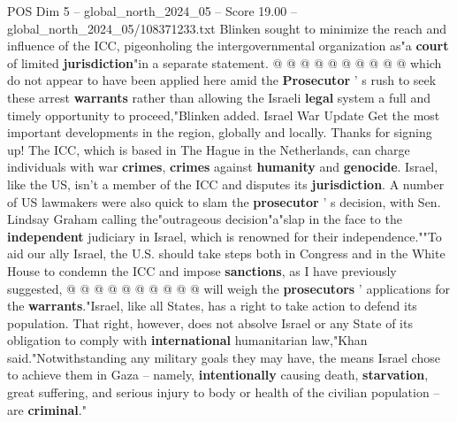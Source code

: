 \begin{textsample}{POS Dim 5 – global\_north\_2024\_05 – Score 19.00 – global\_north\_2024\_05/108371233.txt}
Blinken sought to minimize the reach and influence of the ICC, pigeonholing the intergovernmental organization as"a \textbf{court} of limited \textbf{jurisdiction}"in a separate statement. @ @ @ @ @ @ @ @ @ @ which do not appear to have been applied here amid the \textbf{Prosecutor} ' s rush to seek these arrest \textbf{warrants} rather than allowing the Israeli \textbf{legal} system a full and timely opportunity to proceed,"Blinken added.
Israel War Update Get the most important developments in the region, globally and locally.
Thanks for signing up!
The ICC, which is based in The Hague in the Netherlands, can charge individuals with war \textbf{crimes}, \textbf{crimes} against \textbf{humanity} and \textbf{genocide}.
Israel, like the US, isn't a member of the ICC and disputes its \textbf{jurisdiction}.
A number of US lawmakers were also quick to slam the \textbf{prosecutor} ' s decision, with Sen.
Lindsay Graham calling the"outrageous decision"a"slap in the face to the \textbf{independent} judiciary in Israel, which is renowned for their independence.""To aid our ally Israel, the U.S. should take steps both in Congress and in the White House to condemn the ICC and impose \textbf{sanctions}, as I have previously suggested, @ @ @ @ @ @ @ @ @ @ will weigh the \textbf{prosecutors} ' applications for the \textbf{warrants}."Israel, like all States, has a right to take action to defend its population.
That right, however, does not absolve Israel or any State of its obligation to comply with \textbf{international} humanitarian law,"Khan said."Notwithstanding any military goals they may have, the means Israel chose to achieve them in Gaza -- namely, \textbf{intentionally} causing death, \textbf{starvation}, great suffering, and serious injury to body or health of the civilian population -- are \textbf{criminal}."

\end{textsample}
